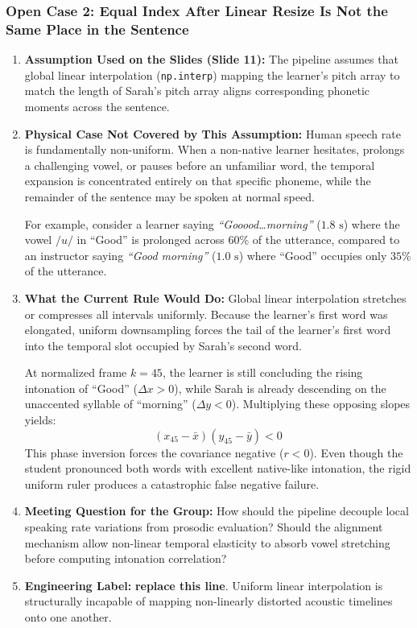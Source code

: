 \documentclass[11pt,a4paper]{article}
\begin{document}
\subsubsection*{Open Case 2: Equal Index After Linear Resize Is Not the Same Place in the Sentence}

\begin{enumerate}
    \item \textbf{Assumption Used on the Slides (Slide 11):} The pipeline assumes that global linear interpolation (\texttt{np.interp}) mapping the learner's pitch array to match the length of Sarah's pitch array aligns corresponding phonetic moments across the sentence.
    \item \textbf{Physical Case Not Covered by This Assumption:} Human speech rate is fundamentally non-uniform. When a non-native learner hesitates, prolongs a challenging vowel, or pauses before an unfamiliar word, the temporal expansion is concentrated entirely on that specific phoneme, while the remainder of the sentence may be spoken at normal speed. 
    
    For example, consider a learner saying \textit{``Gooood\dots morning''} ($1.8\text{ s}$) where the vowel $/u/$ in ``Good'' is prolonged across $60\%$ of the utterance, compared to an instructor saying \textit{``Good morning''} ($1.0\text{ s}$) where ``Good'' occupies only $35\%$ of the utterance.
    \item \textbf{What the Current Rule Would Do:} Global linear interpolation stretches or compresses all intervals uniformly. Because the learner's first word was elongated, uniform downsampling forces the tail of the learner's first word into the temporal slot occupied by Sarah's second word. 
    
    At normalized frame $k = 45$, the learner is still concluding the rising intonation of ``Good'' ($\Delta x > 0$), while Sarah is already descending on the unaccented syllable of ``morning'' ($\Delta y < 0$). Multiplying these opposing slopes yields:
    \begin{equation}
    (x_{45} - \bar{x})(y_{45} - \bar{y}) < 0
    \end{equation}
    This phase inversion forces the covariance negative ($r < 0$). Even though the student pronounced both words with excellent native-like intonation, the rigid uniform ruler produces a catastrophic false negative failure.
    \item \textbf{Meeting Question for the Group:} How should the pipeline decouple local speaking rate variations from prosodic evaluation? Should the alignment mechanism allow non-linear temporal elasticity to absorb vowel stretching before computing intonation correlation?
    \item \textbf{Engineering Label:} \textbf{replace this line}. Uniform linear interpolation is structurally incapable of mapping non-linearly distorted acoustic timelines onto one another.
\end{enumerate}
\end{document}
